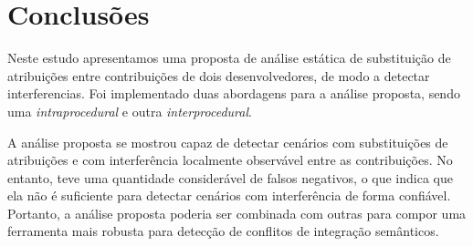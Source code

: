 \section{Conclusões}

Neste estudo apresentamos uma proposta de análise estática de substituição de atribuições entre contribuições de dois desenvolvedores, de modo a detectar interferencias. Foi implementado duas abordagens para a análise proposta, sendo uma \emph{intraprocedural} e outra \emph{interprocedural}.


A análise proposta se mostrou capaz de detectar cenários com substituições de atribuições e com interferência localmente observável entre as contribuições. No entanto, teve uma quantidade considerável de falsos negativos, o que indica que ela não é suficiente para detectar cenários com interferência de forma confiável. Portanto, a análise proposta poderia ser combinada com outras para compor uma ferramenta mais robusta para detecção de conflitos de integração semânticos.

